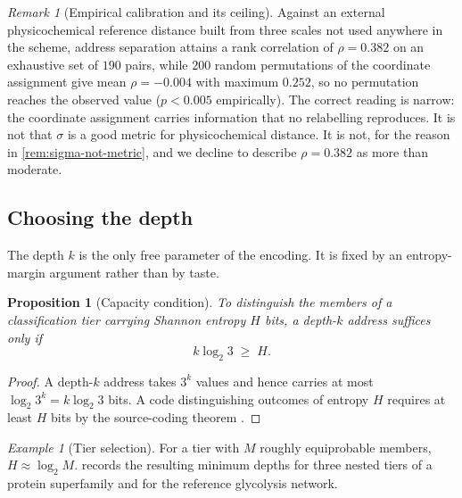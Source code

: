 \documentclass[11pt,twocolumn,a4paper]{article}
\theoremstyle{plain}
\newtheorem{proposition}[theorem]{Proposition}
\theoremstyle{definition}
\theoremstyle{remark}
\newtheorem{remark}[theorem]{Remark}
\newtheorem{example}[theorem]{Example}
\begin{document}
\begin{remark}[Empirical calibration and its ceiling]
Against an external physicochemical reference distance built from three scales
not used anywhere in the scheme, address separation attains a rank correlation
of $\rho = 0.382$ on an exhaustive set of $190$ pairs, while $200$ random
permutations of the coordinate assignment give mean $\rho = -0.004$ with maximum
$0.252$, so no permutation reaches the observed value ($p < 0.005$ empirically).
The correct reading is narrow: the coordinate assignment carries information
that no relabelling reproduces. It is not that $\sigma$ is a good metric for
physicochemical distance. It is not, for the reason in
\cref{rem:sigma-not-metric}, and we decline to describe $\rho = 0.382$ as more
than moderate.
\end{remark}

\subsection{Choosing the depth}
\label{sec:depth}

The depth $k$ is the only free parameter of the encoding. It is fixed by an
entropy-margin argument rather than by taste.

\begin{proposition}[Capacity condition]
\label{prop:capacity}
To distinguish the members of a classification tier carrying Shannon entropy
$H$ bits, a depth-$k$ address suffices only if
\begin{equation}
k\log_2 3 \;\ge\; H .
\label{eq:capacity}
\end{equation}
\end{proposition}

\begin{proof}
A depth-$k$ address takes $3^{k}$ values and hence carries at most
$\log_2 3^{k} = k\log_2 3$ bits. A code distinguishing outcomes of entropy $H$
requires at least $H$ bits by the source-coding theorem \citep{Shannon1948,Cover2006}.
\end{proof}

\begin{example}[Tier selection]
\label{ex:tiers}
For a tier with $M$ roughly equiprobable members, $H \approx \log_2 M$.
 records the resulting minimum depths for three nested tiers of
a protein superfamily and for the reference glycolysis network.
\end{example}
\end{document}
